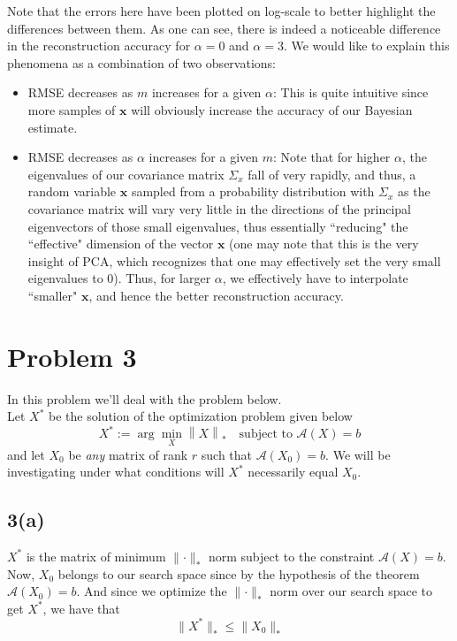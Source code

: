 \documentclass[a4paper,14pt]{article}
\numberwithin{definition}{section}
\numberwithin{mytheorem}{subsection}
\newcommand\norm[1]{\left\lVert#1\right\rVert}
\begin{document}
Note that the errors here have been plotted on log-scale to better highlight the differences between them. As one can see, there is indeed a noticeable difference in the reconstruction accuracy for $\alpha = 0$ and $\alpha = 3$. We would like to explain this phenomena as a combination of two observations:
\begin{itemize}
    \item RMSE decreases as $m$ increases for a given $\alpha$: This is quite intuitive since more samples of $\boldsymbol{x}$ will obviously increase the accuracy of our Bayesian estimate.
    \item RMSE decreases as $\alpha$ increases for a given $m$: Note that for higher $\alpha$, the eigenvalues of our covariance matrix $\Sigma_x$ fall of very rapidly, and thus, a random variable $\boldsymbol{x}$ sampled from a probability distribution with $\Sigma_x$ as the covariance matrix will vary very little in the directions of the principal eigenvectors of those small eigenvalues, thus essentially ``reducing" the ``effective" dimension of the vector $\boldsymbol{x}$ (one may note that this is the very insight of PCA, which recognizes that one may effectively set the very small eigenvalues to 0). Thus, for larger $\alpha$, we effectively have to interpolate ``smaller" $\boldsymbol{x}$, and hence the better reconstruction accuracy.
\end{itemize}
\section{Problem 3}
In this problem we'll deal with the problem below.\\
Let $X^*$ be the solution of the optimization problem given below
$$X^* := \arg \min \limits_{X} \norm{X}_* \quad \text{subject to } \mathcal{A}(X) = b$$
and let $X_0$ be \emph{any} matrix of rank $r$ such that $\mathcal{A}(X_0) = b$. We will be investigating under what conditions will $X^*$ necessarily equal $X_0$.
\subsection{3(a)}
$X^*$ is the matrix of minimum $\lVert\cdot\rVert_*$ norm subject to the constraint $\mathcal{A}(X) = b$. Now, $X_0$ belongs to our search space since by the hypothesis of the theorem $\mathcal{A}(X_0) = b$. And since we optimize the $\lVert\cdot\rVert_*$ norm over our search space to get $X^*$, we have that
$$\lVert X^*\rVert_* \leq \lVert X_0\rVert_*$$
\end{document}
